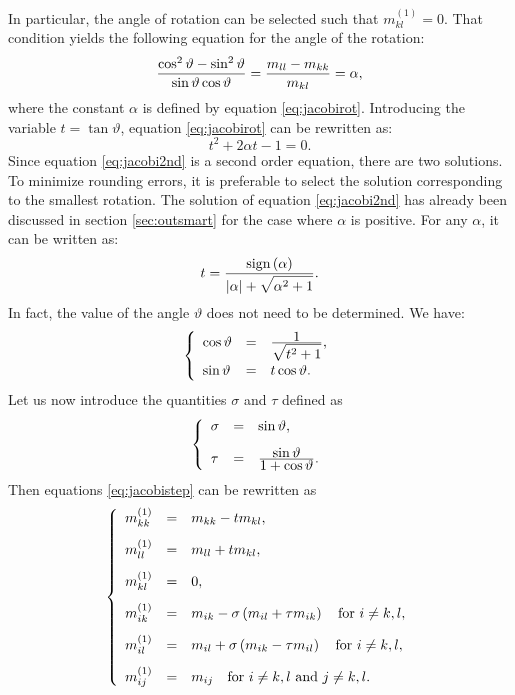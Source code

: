 In particular, the angle of rotation can be selected such that
$m^{\left(1\right)}_{kl}=0$. That condition yields the following
equation for the angle of the rotation:
\begin{equation}
\label{eq:jacobirot}
  {\cos^2\vartheta-\sin^2\vartheta
  \over\sin\vartheta\cos\vartheta}={m_{ll} - m_{kk}\over
  m_{kl}}=\alpha,
\end{equation}
where the constant $\alpha$ is defined by equation
\ref{eq:jacobirot}. Introducing the variable $t=\tan\vartheta$,
equation \ref{eq:jacobirot} can be rewritten as:
\begin{equation}
\label{eq:jacobi2nd}
  t^2+2\alpha t - 1 =0.
\end{equation}
Since equation \ref{eq:jacobi2nd} is a second order equation,
there are two solutions. To minimize rounding errors, it is
preferable to select the solution corresponding to the smallest
rotation\cite{Press}. The solution of equation \ref{eq:jacobi2nd}
has already been discussed in section \ref{sec:outsmart} for the
case where $\alpha$ is positive. For any $\alpha$, it can be
written as:
\begin{equation}
\label{eq:jacobisolinverse}
  t={\displaystyle\mathop{\textrm{sign}}\left(\alpha\right)\over\displaystyle\left|\alpha\right|+\sqrt{\alpha^2+1}}.
\end{equation}
In fact, the value of the angle $\vartheta$ does not need to be
determined. We have:
\begin{equation}
  \left\{
  \begin{array}{lcl}
    \cos\vartheta&=&{\displaystyle 1\over\displaystyle
    \sqrt{t^2+1}},\\*[2ex]
    \sin\vartheta&=&t\cos\vartheta. \end{array}
  \right.
\end{equation}
Let us now introduce the quantities $\sigma$ and $\tau$ defined as
\begin{equation}
  \left\{
  \begin{array}{lcl}
    \sigma&=&\sin\vartheta,\\*[2ex]
    \tau&=&{\displaystyle\sin\vartheta \over\displaystyle 1+\cos\vartheta}.\end{array}
  \right.
\end{equation}
Then equations \ref{eq:jacobistep} can be rewritten as
\begin{equation}
\label{eq:jacobistepfinal}
  \left\{
  \begin{array}{lcl}
    m^{\left(1\right)}_{kk} &=& m_{kk} - t m_{kl}, \\*[2ex]
    m^{\left(1\right)}_{ll} &=& m_{ll} + t m_{kl}, \\*[2ex]
    m^{\left(1\right)}_{kl} &=& 0, \\*[2ex]
    m^{\left(1\right)}_{ik} &=& m_{ik}-\sigma\left( m_{il}+\tau m_{ik}\right)\mbox{\quad for $i\ne k,l$}, \\*[2ex]
    m^{\left(1\right)}_{il} &=& m_{il}+\sigma\left( m_{ik}-\tau m_{il}\right)\mbox{\quad for $i\ne k,l$}, \\*[2ex]
    m^{\left(1\right)}_{ij} &=& m_{ij}\mbox{\quad for $i\ne k,l$ and $j\ne k,l$}.  \end{array}
  \right.
\end{equation}

